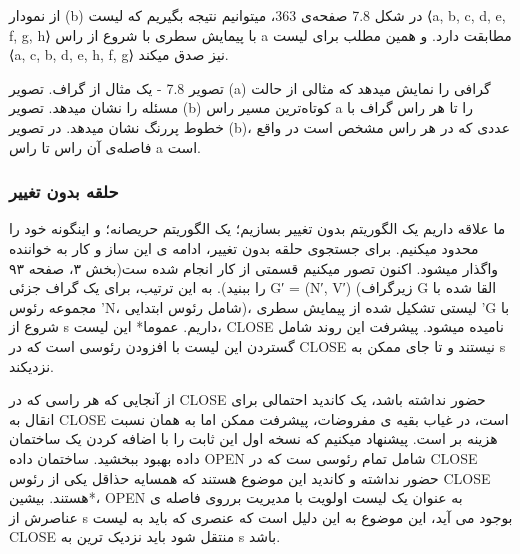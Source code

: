 \documentclass{book} %
\begin{document}
از نمودار (b) در شکل 7.8 صفحه‌ی 363، میتوانیم نتیجه بگیریم که لیست ⟨a, b, c, d, e, f, g, h⟩ با پیمایش سطری با شروع از راس a مطابقت دارد. و همین مطلب برای لیست ⟨a, c, b, d, e, h, f, g⟩ نیز صدق میکند.

    
  
  



تصویر 7.8 - یک مثال از گراف. تصویر (a) گرافی را نمایش میدهد که مثالی از حالت مسئله را نشان میدهد.  تصویر (b) کوتاه‌ترین مسیر راس a را تا هر راس گراف با خطوط پررنگ نشان میدهد. در تصویر (b)، عددی که در هر راس مشخص است در واقع فاصله‌ی آن راس تا راس a است.



\newpage
\subsubsection*{حلقه بدون تغییر}

ما علاقه داریم یک الگوریتم بدون تغییر بسازیم؛ یک الگوریتم حریصانه؛ و اینگونه خود را محدود میکنیم. برای جستجوی حلقه بدون تغییر، ادامه ی این ساز و کار به خواننده واگذار میشود. اکنون تصور میکنیم قسمتی از کار انجام شده ست(بخش ۳، صفحه ۹۳ را ببنید). به این ترتیب، برای یک گراف جزئی G′ = (N′, V′) (زیرگراف G القا شده با مجموعه رئوس 'N، شامل رئوس ابتدایی)، لیستی تشکیل شده از پیمایش سطری 'G با شروع از s داریم.
عموما* این لیست، CLOSE نامیده میشود. پیشرفت این روند شامل گستردن این لیست با افزودن رئوسی است که در CLOSE نیستند و تا جای ممکن به s نزدیکند.


از آنجایی که هر راسی که در CLOSE حضور نداشته باشد، یک کاندید احتمالی برای انقال به CLOSE است، در غیاب بقیه ی مفروضات، پیشرفت ممکن اما به همان نسبت هزینه بر است.
پیشنهاد میکنیم که نسخه اول این ثابت را با اضافه کردن یک ساختمان داده بهبود ببخشید. ساختمان داده OPEN شامل تمام رئوسی ست که در CLOSE حضور نداشته و کاندید این موضوع هستند که همسایه حذاقل یکی از رئوس CLOSE هستند.
بیشین*، OPEN به عنوان یک لیست اولویت با مدیریت برروی فاصله ی عناصرش از ‌s بوجود می آید، این موضوع به این دلیل است که عنصری که باید به لیست CLOSE منتقل شود باید نزدیک ترین به s باشد.
\end{document}
